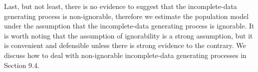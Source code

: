 Last, 
but not least,
there is no evidence to suggest that the incomplete-data generating process is non-ignorable,
therefore we estimate the population model under the assumption that the incomplete-data generating process is ignorable.
It is worth noting that the assumption of ignorability is a strong assumption,
but it is convenient and defensible unless there is strong evidence to the contrary.
We discuss how to deal with non-ignorable incomplete-data generating processes in Section 9.4.
